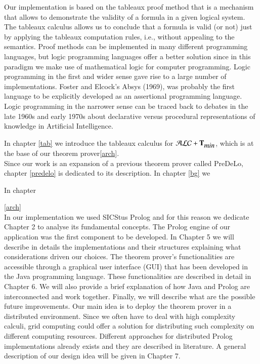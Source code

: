 \documentclass[a4paper, 11pt, oneside]{elsarticle}
\newcommand{\tip}{{\bf T}}
\newcommand{\alctmin}{\mathcal{ALC}+\tip_{\mbox{\em min}}}
\begin{document}
Our implementation is based on the tableaux proof method that is a mechanism that allows to demonstrate the validity of a formula in a given logical system.
The tableaux calculus allows us to conclude that a formula is valid (or not) just by applying the tableaux computation rules, i.e., without appealing to the semantics.
Proof methods can be implemented in many different programming languages, but logic programming languages offer a better solution since in this paradigm we make use of mathematical logic for computer programming.
Logic programming in the first and wider sense gave rise to a large number of implementations. Foster and Elcock’s Absys (1969), was probably the first language to be explicitly developed as an assertional programming language. Logic programming in the narrower sense can be traced back to debates in the late 1960s and early 1970s about declarative versus procedural representations of knowledge in Artificial Intelligence.

In chapter \ref{tab} we introduce the tableaux calculus for $\alctmin$, which is at the base of our theorem prover\ref{arch}.\\

Since our work is an expansion of a previous theorem prover called PreDeLo, chapter \ref{predelo} is dedicated to its description. In chapter \ref{bg} we 

In chapter 


\ref{arch}\\

In our implementation we used SICStus Prolog and for this reason we dedicate Chapter 2 to analyse its fundamental concepts.
The Prolog engine of our application was the first component to be developed. In Chapter 5 we will describe in details the implementations and their structures explaining what considerations driven our choices.
The theorem prover’s functionalities are accessible through a graphical user interface (GUI) that has been developed in the Java programming language.
These functionalities are described in detail in Chapter 6.
We will also provide a brief explanation of how Java and Prolog are interconnected and work together.
Finally, we will describe what are the possible future improvements.
Our main idea is to deploy the theorem prover in a distributed environment.
Since we often have to deal with high complexity calculi, grid computing could offer a solution for distributing such complexity on different computing resources.
Different approaches for distributed Prolog implementations already exists and they are described in literature.
A general description of our design idea will be given in Chapter 7.
\end{document}
